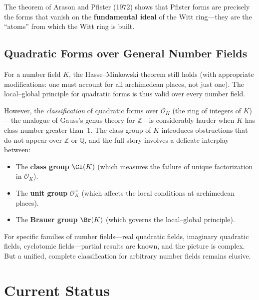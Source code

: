 The theorem of Arason and Pfister (1972) shows that Pfister forms are precisely the forms that vanish on the \textbf{fundamental ideal} of the Witt ring---they are the ``atoms'' from which the Witt ring is built.

\subsection{Quadratic Forms over General Number Fields}

For a number field $K$, the Hasse--Minkowski theorem still holds (with appropriate modifications: one must account for all archimedean places, not just one). The local--global principle for quadratic forms is thus valid over every number field.

However, the \emph{classification} of quadratic forms over $\mathcal{O}_K$ (the ring of integers of $K$)---the analogue of Gauss's genus theory for $\mathbb{Z}$---is considerably harder when $K$ has class number greater than~1. The class group of $K$ introduces obstructions that do not appear over $\mathbb{Z}$ or $\mathbb{Q}$, and the full story involves a delicate interplay between:
\begin{itemize}
    \item The \textbf{class group} $\Cl(K)$ (which measures the failure of unique factorization in $\mathcal{O}_K$).
    \item The \textbf{unit group} $\mathcal{O}_K^\times$ (which affects the local conditions at archimedean places).
    \item The \textbf{Brauer group} $\Br(K)$ (which governs the local--global principle).
\end{itemize}

For specific families of number fields---real quadratic fields, imaginary quadratic fields, cyclotomic fields---partial results are known, and the picture is complex. But a unified, complete classification for arbitrary number fields remains elusive.

\section{Current Status}

